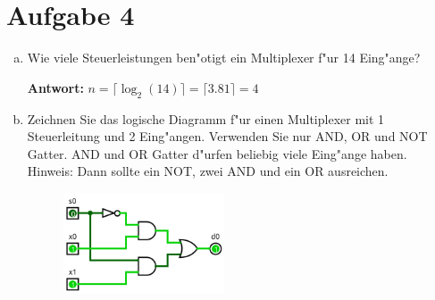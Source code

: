 \documentclass[10pt, oneside]{article}
\begin{document}
\section{Aufgabe 4}

\begin{enumerate}[(a)]
    \item Wie viele Steuerleistungen ben"otigt ein Multiplexer f"ur 14 Eing"ange?

        \textbf{Antwort:} $n = {\lceil}{\log}_2(14){\rceil} = {\lceil}3.81{\rceil} = 4$

    \item Zeichnen Sie das logische Diagramm f"ur einen Multiplexer mit 1
        Steuerleitung und 2 Eing"angen. Verwenden Sie nur AND, OR und NOT
        Gatter. AND und OR Gatter d"urfen beliebig viele Eing"ange haben.
        Hinweis: Dann sollte ein NOT, zwei AND und ein OR ausreichen.

        \begin{figure}[h]
            \centering
            \includegraphics[width=0.45\textwidth]{./assets/aufgabe-4b.png}
        \end{figure}
\end{enumerate}
\end{document}

